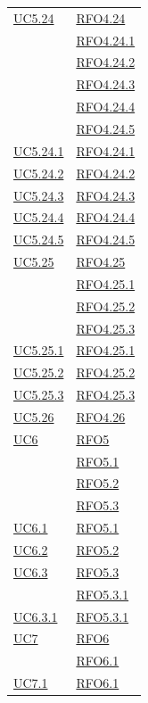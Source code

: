 \begin{itemize}
\begin{itemize}
\begin{itemize}
\begin{itemize}
\begin{longtable}{|>{\centering}m{5cm}|m{5cm}<{\centering}|}
\hyperref[UC5.24]{UC5.24} & \hyperlink{RFO4.24}{RFO4.24}\\
& \hyperlink{RFO4.24.1}{RFO4.24.1}\\
& \hyperlink{RFO4.24.2}{RFO4.24.2}\\
& \hyperlink{RFO4.24.3}{RFO4.24.3}\\
& \hyperlink{RFO4.24.4}{RFO4.24.4}\\
& \hyperlink{RFO4.24.5}{RFO4.24.5}\\ \hline
\hyperref[UC5.24.1]{UC5.24.1} & \hyperlink{RFO4.24.1}{RFO4.24.1}\\ \hline
 \hyperref[UC5.24.2]{UC5.24.2} & \hyperlink{RFO4.24.2}{RFO4.24.2}\\ \hline
\hyperref[UC5.24.3]{UC5.24.3} & \hyperlink{RFO4.24.3}{RFO4.24.3}\\ \hline
\hyperref[UC5.24.4]{UC5.24.4} & \hyperlink{RFO4.24.4}{RFO4.24.4}\\ \hyperref[UC5.24.5]{UC5.24.5} & \hyperlink{RFO4.24.5}{RFO4.24.5}\\ \hline

\hyperref[UC5.25]{UC5.25} & \hyperlink{RFO4.25}{RFO4.25}\\
& \hyperlink{RFO4.25.1}{RFO4.25.1}\\
& \hyperlink{RFO4.25.2}{RFO4.25.2}\\
& \hyperlink{RFO4.25.3}{RFO4.25.3}\\ \hline
\hyperref[UC5.25.1]{UC5.25.1} & \hyperlink{RFO4.25.1}{RFO4.25.1}\\\hline
\hyperref[UC5.25.2]{UC5.25.2} & \hyperlink{RFO4.25.2}{RFO4.25.2}\\\hline
\hyperref[UC5.25.3]{UC5.25.3} & \hyperlink{RFO4.25.3}{RFO4.25.3}\\\hline
\hyperref[UC5.26]{UC5.26} & \hyperlink{RFO4.26}{RFO4.26}\\\hline

\hyperref[UC6]{UC6} & \hyperlink{RFO5}{RFO5}\\
 & \hyperlink{RFO5.1}{RFO5.1}\\
 & \hyperlink{RFO5.2}{RFO5.2}\\
 & \hyperlink{RFO5.3}{RFO5.3}\\ \hline
 \hyperref[UC6.1]{UC6.1} & \hyperlink{RFO5.1}{RFO5.1}\\ \hline
 \hyperref[UC6.2]{UC6.2} & \hyperlink{RFO5.2}{RFO5.2}\\ \hline
 \hyperref[UC6.3]{UC6.3} & \hyperlink{RFO5.3}{RFO5.3}\\
 & \hyperlink{RFO5.3.1}{RFO5.3.1}\\ \hline
  \hyperref[UC6.3.1]{UC6.3.1} & \hyperlink{RFO5.3.1}{RFO5.3.1}\\ \hline
\hyperref[UC7]{UC7} & \hyperlink{RFO6}{RFO6}\\
& \hyperlink{RFO6.1}{RFO6.1}\\ \hline
\hyperref[UC7.1]{UC7.1} & \hyperlink{RFO6.1}{RFO6.1}\\ \hline


\end{longtable}
\end{itemize}
\end{itemize}
\end{itemize}
\end{itemize}
